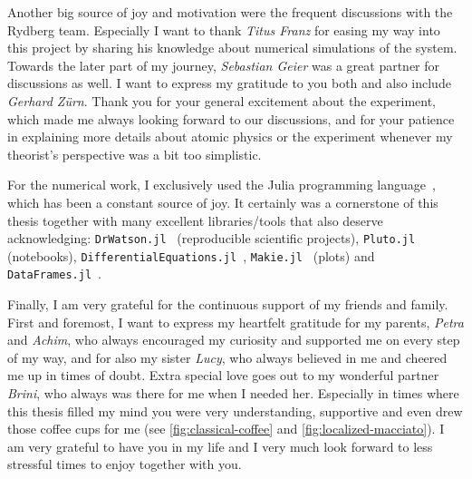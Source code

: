 Another big source of joy and motivation were the frequent discussions with the Rydberg team. Especially I want to thank \emph{Titus Franz} for easing my way into this project by sharing his knowledge about numerical simulations of the system. Towards the later part of my journey, \emph{Sebastian Geier} was a great partner for discussions as well. I want to express my gratitude to you both and also include \emph{Gerhard Zürn}. Thank you for your general excitement about the experiment, which made me always looking forward to our discussions, and for your patience in explaining more details about atomic physics or the experiment whenever my theorist's perspective was a bit too simplistic.

For the numerical work, I exclusively used the Julia programming language~\cite{bezansonJuliaFreshApproach2017}, which has been a constant source of joy. It certainly was a cornerstone of this thesis together with many excellent libraries/tools that also deserve acknowledging: \texttt{DrWatson.jl}~\cite{datserisDrWatsonPerfectSidekick2020} (reproducible scientific projects), \texttt{Pluto.jl}~\cite{fonsvanderplasPlutoJl2024} (notebooks), \texttt{DifferentialEquations.jl}~\cite{rackauckas2017differentialequations}, \texttt{Makie.jl}~\cite{danischMakieJlFlexible2021} (plots) and \texttt{DataFrames.jl}~\cite{bouchet-valatDataframesJlFlexible2023}.

Finally, I am very grateful for the continuous support of my friends and family. First and foremost, I want to express my heartfelt gratitude for my parents, \emph{Petra} and \emph{Achim}, who always encouraged my curiosity and supported me on every step of my way, and for also my sister \emph{Lucy}, who always believed in me and cheered me up in times of doubt.
Extra special love goes out to my wonderful partner \emph{Brini}, who always was there for me when I needed her. Especially in times where this thesis filled my mind you were very understanding, supportive and even drew those coffee cups for me (see \autoref{fig:classical-coffee} and \autoref{fig:localized-macciato}).
I am very grateful to have you in my life and I very much look forward to less stressful times to enjoy together with you.

\endgroup
